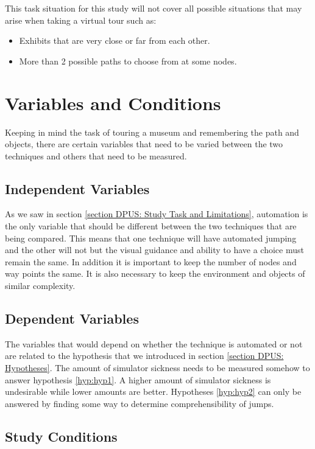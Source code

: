 This task situation for this study will not cover all possible situations that may arise when taking a virtual tour such as:
\begin{itemize}
	\item Exhibits that are very close or far from each other.
	\item More than 2 possible paths to choose from at some nodes.
\end{itemize} 

\section{Variables and Conditions}
\label{section DPUS: Variables and Conditions}
Keeping in mind the task of touring a museum and remembering the path and objects, there are certain variables that need to be varied between the two techniques and others that need to be measured. 

\subsection{Independent Variables}
\label{subsection DPUS VC: Independent Variables}
As we saw in section \ref{section DPUS: Study Task and Limitations}, automation is the only variable that should be different between the two techniques that are being compared. This means that one technique will have automated jumping and the other will not but the visual guidance and ability to have a choice must remain the same. In addition it is important to keep the number of nodes and way points the same. It is also necessary to keep the environment and objects of similar complexity. 

\subsection{Dependent Variables}
\label{subsection DPUS VC: Dependent Variables}
The variables that would depend on whether the technique is automated or not are related to the hypothesis that we introduced in section \ref{section DPUS: Hypotheses}. The amount of simulator sickness needs to be measured somehow to answer hypothesis \cref{hyp:hyp1}. A higher amount of simulator sickness is undesirable while lower amounts are better. Hypotheses \cref{hyp:hyp2} can only be answered by finding some way to determine comprehensibility of jumps.

\subsection{Study Conditions}
\label{subsection DPUS VC: Study Conditions}

